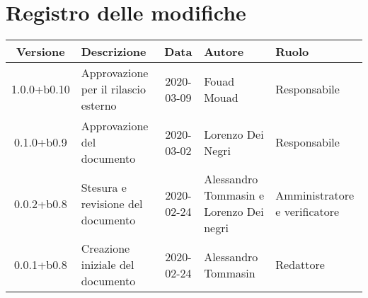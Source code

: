 \section*{Registro delle modifiche}

\begin{center}
	\begin{longtable}{|c|p{3.5cm}|c|p{3cm}|p{3cm}|}
	\hline
	\rowcolor{lighter-grayer}
	\textbf{Versione} & \textbf{Descrizione} & \textbf{Data} & \textbf{Autore} & \textbf{Ruolo} \\
	\hline
	\endfirsthead

	1.0.0+b0.10 & Approvazione per il rilascio esterno & 2020-03-09 & Fouad Mouad & Responsabile \\
	\hline
	0.1.0+b0.9 & Approvazione del documento & 2020-03-02 & Lorenzo Dei Negri & Responsabile \\
	\hline
	0.0.2+b0.8 & Stesura e revisione del documento & 2020-02-24 & Alessandro Tommasin e Lorenzo Dei negri & Amministratore e verificatore \\
	\hline
	0.0.1+b0.8 & Creazione iniziale del documento & 2020-02-24 & Alessandro Tommasin & Redattore \\
	\hline

	\end{longtable}
\end{center}